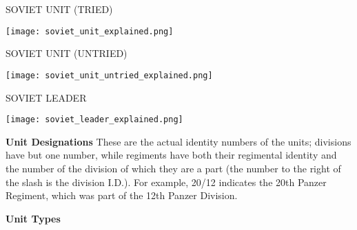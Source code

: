 SOVIET UNIT (TRIED)

\begin{center}
  \texttt{[image: soviet\_unit\_explained.png]}
\end{center}

SOVIET UNIT (UNTRIED)

\begin{center}
  \texttt{[image: soviet\_unit\_untried\_explained.png]}
\end{center}

SOVIET LEADER

\begin{center}
  \texttt{[image: soviet\_leader\_explained.png]}
\end{center}

\textbf{Unit Designations}
These are the actual identity numbers of the units; divisions have but one number, while regiments have both their regimental identity and the number of the division of which they are a part (the number to the right of the slash is the division I.D.). For example, 20/12 indicates the 20th Panzer Regiment, which was part of the 12th Panzer Division.

\textbf{Unit Types}






